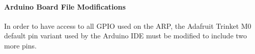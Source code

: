 \documentclass{article}
\begin{document}
\paragraph{Arduino Board File Modifications}
In order to have access to all GPIO used on the ARP, the Adafruit Trinket M0 default pin variant used by the Arduino IDE must be modified to include two more pins.
\end{document}
